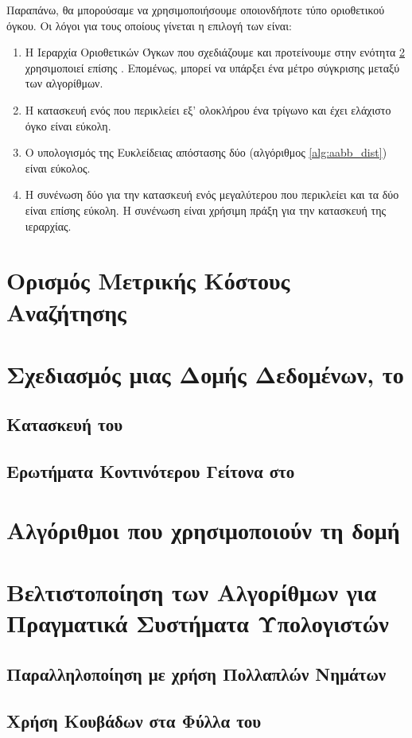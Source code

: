 Παραπάνω, θα μπορούσαμε να χρησιμοποιήσουμε οποιονδήποτε τύπο οριοθετικού όγκου.
Οι λόγοι για τους οποίους γίνεται η επιλογή των  είναι:
\begin{enumerate}
    \item Η Ιεραρχία Οριοθετικών Όγκων που σχεδιάζουμε και προτείνουμε 
    στην ενότητα \ref{sec:design_bvh} χρησιμοποιεί επίσης .
    Επομένως, μπορεί να υπάρξει ένα μέτρο σύγκρισης μεταξύ των 
    αλγορίθμων.
    \item Η κατασκευή ενός  
    που περικλείει εξ' ολοκλήρου ένα τρίγωνο και έχει ελάχιστο όγκο 
    είναι εύκολη.
    \item Ο υπολογισμός της Ευκλείδειας απόστασης 
    δύο  (αλγόριθμος \ref{alg:aabb_dist}) είναι 
    εύκολος.
    \item Η συνένωση δύο  για την κατασκευή 
    ενός μεγαλύτερου που περικλείει και τα δύο είναι επίσης 
    εύκολη. 
    Η συνένωση είναι χρήσιμη πράξη για την κατασκευή της 
    ιεραρχίας. 
\end{enumerate}

\section{Ορισμός Μετρικής Κόστους Αναζήτησης}
\label{sec:cost_metric}

\section{Σχεδιασμός μιας  Δομής Δεδομένων, το }
\label{sec:design_bvh}
\subsection{Κατασκευή του }
\subsection{Ερωτήματα Κοντινότερου Γείτονα στο }

\section{Αλγόριθμοι που χρησιμοποιούν τη δομή }

\section{Βελτιστοποίηση των Αλγορίθμων για Πραγματικά Συστήματα Υπολογιστών}
\subsection{Παραλληλοποίηση με χρήση Πολλαπλών Νημάτων }
\subsection{Χρήση Κουβάδων στα Φύλλα του }